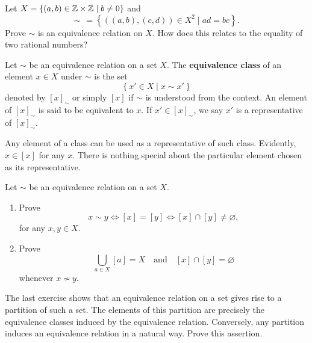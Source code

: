 \documentclass[11pt,a4paper]{article}
\begin{document}
\begin{eje}\label{ej:eqv.rel.on.z2.gives.q}
    Let \(X = \left\{ (a,b  )\in \mathbb{Z}\times \mathbb{Z}     \mid b\neq 0 \right\}\)
    and  \[\sim\;\, = \left\{ ((a,b), (c,d)) \in X^2 \mid ad=bc \right\}.\]
    Prove \(\sim\) is an equivalence relation on \(X\). How does this relates to the equality of two rational numbers?
\end{eje}

\begin{defi}
    Let \(\sim\) be an equivalence relation on a set \(X\).
    The \textbf{equivalence class} of an element \(x\in X\)   under \(\sim\) is the set 
    \[ \left\{ x' \in X \mid x\sim x' \right\}\]
    denoted by \([x]_\sim \) or simply \([x]\) if \(\sim\) is understood from the context.
    An element of \([x]_\sim\) is said to be equivalent to \(x\). 
    If \(x' \in [x]_\sim\), we say \(x'\) is a representative of \([x]_\sim\).
\end{defi}

Any  element of a class
can be used as a representative of such class.
Evidently, \(x\in [x]\) for any \(x\).
There is nothing special about the particular
element chosen as its representative.

\begin{eje}
    Let \(\sim\) be an equivalence relation on a set \(X\).
    \begin{enumerate}[label=(\roman*)]
        \item Prove \[x\sim y \iff [x] = [y] \iff [x]\cap [y] \neq \varnothing,\]
    for any \(x,y\in X\).
        
        \item Prove 
        \[\bigcup_{a\in X} [a] = X\quad \text{and} \quad [x]\cap [y] = \varnothing\]
        whenever \(x\not\sim y \).
    \end{enumerate}
    
\end{eje}

The last exercise shows that an equivalence relation on a set  gives rise to a partition of such a set.
The elements of this partition are precisely the equivalence classes induced by the equivalence relation.
Conversely, any partition induces an equivalence relation in a natural way.
Prove this assertion.

 
\end{document}
